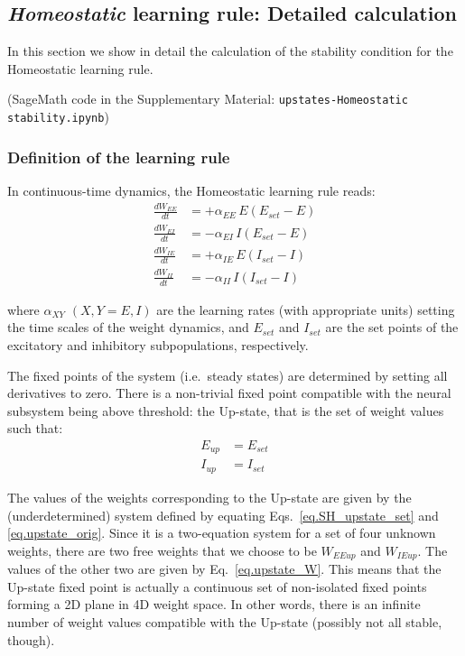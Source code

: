 \documentclass[twocolumn]{article}
\newcommand{\EE}{\mathit{EE}}
\newcommand{\EI}{\mathit{EI}}
\newcommand{\IE}{\mathit{IE}}
\newcommand{\II}{\mathit{II}}
\newcommand{\XY}{\mathit{XY}}
\newcommand{\set}{\mathit{set}}
\newcommand{\up}{\mathit{up}}
\begin{document}
\subsection{{\em Homeostatic} learning rule: Detailed calculation}
\label{sec.SH_details}

In this section we show in detail the calculation of the stability condition for the Homeostatic learning rule.

(SageMath code in the Supplementary Material: {\tt upstates-Homeostatic stability.ipynb})


\subsubsection{Definition of the learning rule}

In continuous-time dynamics, the Homeostatic learning rule reads:
\begin{equation}
\begin{aligned}
\frac{dW_{\EE}}{dt} & = +\alpha_{\EE} \, E (E_{\set} - E) \\
\frac{dW_{\EI}}{dt} & = -\alpha_{\EI} \, I (E_{\set} - E) \\
\frac{dW_{\IE}}{dt} & = +\alpha_{\IE} \, E (I_{\set} - I) \\
\frac{dW_{\II}}{dt} & = -\alpha_{\II} \, I (I_{\set} - I)
\end{aligned}
\label{eq.SH_equation}
\end{equation}

\noindent where $\alpha_{\XY}$ $(X,Y=E,I)$ are the learning rates (with appropriate units) setting the time scales of the weight dynamics, and $E_{\set}$ and $I_{\set}$ are the set points of the excitatory and inhibitory subpopulations, respectively.

The fixed points of the system (i.e.\ steady states) are determined by setting all derivatives to zero. There is a non-trivial fixed point compatible with the neural subsystem being above threshold: the Up-state, that is the set of weight values such that:
\begin{equation}
\begin{aligned}
E_{\up} & = E_{\set} \\
I_{\up} & = I_{\set}
\end{aligned}
\label{eq.SH_upstate_set}
\end{equation}

\noindent The values of the weights corresponding to the Up-state are given by the (underdetermined) system defined by equating Eqs.\ \ref{eq.SH_upstate_set} and \ref{eq.upstate_orig}. Since it is a two-equation system for a set of four unknown weights, there are two free weights that we choose to be $W_{\EE\up}$ and $W_{\IE\up}$. The values of the other two are given by Eq.\ \ref{eq.upstate_W}. This means that the Up-state fixed point is actually a continuous set of non-isolated fixed points forming a 2D plane in 4D weight space. In other words, there is an infinite number of weight values compatible with the Up-state (possibly not all stable, though).
\end{document}
